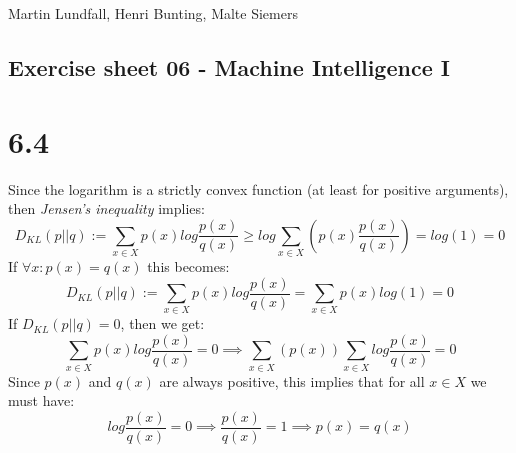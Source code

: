 \documentclass[11pt,a4paper]{article}
\begin{document}
\noindent
Martin Lundfall, Henri Bunting, Malte Siemers
\begin{centering}
  \section*{Exercise sheet 06 - Machine Intelligence I}
  \end{centering}
\section*{6.4}
Since the logarithm is a strictly convex function (at least for positive arguments), then \textit{Jensen's inequality} implies:
\begin{equation}
  D_{KL}(p||q):= \sum_{x \in X}p(x)log\frac{p(x)}{q(x)}  \geq log \sum_{x \in X}(p(x)\frac{p(x)}{q(x)}) = log(1) = 0
\end{equation}
If $\forall x: p(x)=q(x)$ this becomes:
\begin{equation}
D_{KL}(p||q):= \sum_{x \in X}p(x)log\frac{p(x)}{q(x)} = \sum_{x \in X}p(x)log(1) = 0
\end{equation}
If $D_{KL}(p||q) = 0$, then we get:
\begin{equation}
  \sum_{x \in X}p(x)log\frac{p(x)}{q(x)}=0 \implies \sum_{x \in X}(p(x)) \sum_{x \in X}log\frac{p(x)}{q(x)} = 0
\end{equation}
Since $p(x)$ and $q(x)$ are always positive, this implies that for all $x \in X$ we must have:
\begin{equation*}
  log\frac{p(x)}{q(x)} = 0 \implies \frac{p(x)}{q(x)} = 1 \implies p(x)=q(x)
\end{equation*}
\end{document}
